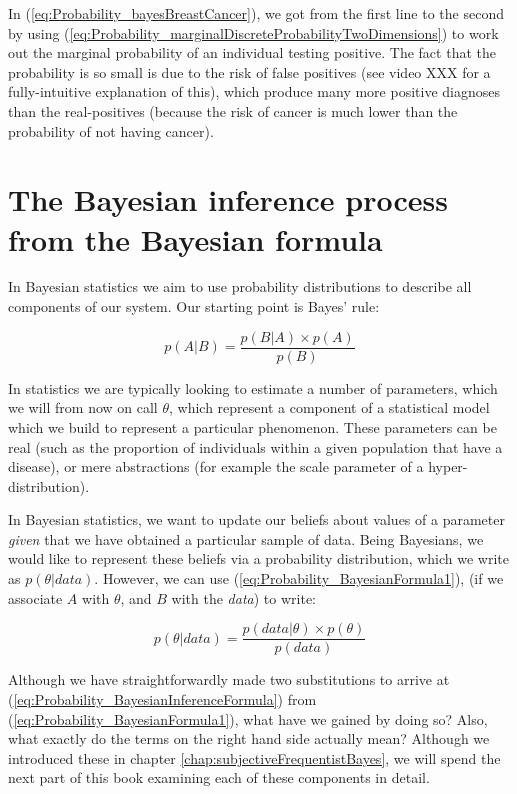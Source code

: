 \documentclass[11pt,fullpage]{book}
\begin{document}
In (\ref{eq:Probability_bayesBreastCancer}), we got from the first line to the second by using (\ref{eq:Probability_marginalDiscreteProbabilityTwoDimensions}) to work out the marginal probability of an individual testing positive. The fact that the probability is so small is due to the risk of false positives (see video XXX for a fully-intuitive explanation of this), which produce many more positive diagnoses than the real-positives (because the risk of cancer is much lower than the probability of not having cancer).

\section{The Bayesian inference process from the Bayesian formula}
In Bayesian statistics we aim to use probability distributions to describe all components of our system. Our starting point is Bayes' rule:

\begin{equation}\label{eq:Probability_BayesianFormula1}
p(A|B) = \frac{p(B|A)\times p(A)}{p(B)}
\end{equation}

In statistics we are typically looking to estimate a number of parameters, which we will from now on call $\theta$, which represent a component of a statistical model which we build to represent a particular phenomenon. These parameters can be real (such as the proportion of individuals within a given population that have a disease), or mere abstractions (for example the scale parameter of a hyper-distribution).

In Bayesian statistics, we want to update our beliefs about values of a parameter \textit{given} that we have obtained a particular sample of data. Being Bayesians, we would like to represent these beliefs via a probability distribution, which we write as $p(\theta|data)$. However, we can use (\ref{eq:Probability_BayesianFormula1}), (if we associate $A$ with $\theta$, and $B$ with the \textit{data}) to write:

\begin{equation}\label{eq:Probability_BayesianInferenceFormula}
p(\theta|data) = \frac{p(data|\theta)\times p(\theta)}{p(data)}
\end{equation}

Although we have straightforwardly made two substitutions to arrive at (\ref{eq:Probability_BayesianInferenceFormula}) from (\ref{eq:Probability_BayesianFormula1}), what have we gained by doing so? Also, what exactly do the terms on the right hand side actually mean? Although we introduced these in chapter \ref{chap:subjectiveFrequentistBayes}, we will spend the next part of this book examining each of these components in detail.
\end{document}

